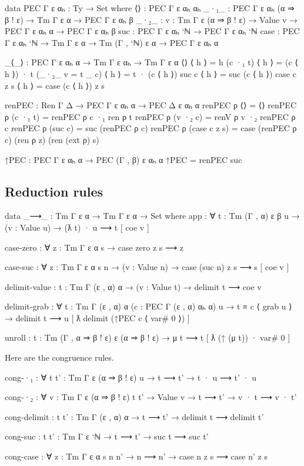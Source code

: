 \begin{code}
data PEC Γ ε αₕ : Ty → Set where
  ⟨⟩ : PEC Γ ε αₕ αₕ
  _·₁_ : PEC Γ ε αₕ (α ⇒ β ! ε) → Tm Γ ε α → PEC Γ ε αₕ β
  _·₂_ : {v : Tm Γ ε (α ⇒ β ! ε)} → Value v → PEC Γ ε αₕ α → PEC Γ ε αₕ β
  suc : PEC Γ ε αₕ `ℕ → PEC Γ ε αₕ `ℕ
  case : PEC Γ ε αₕ `ℕ → Tm Γ ε α → Tm (Γ , `ℕ) ε α → PEC Γ ε αₕ α

_⟨_⟩ : PEC Γ ε αₕ α → Tm Γ ε αₕ → Tm Γ ε α
⟨⟩ ⟨ h ⟩ = h
(c ·₁ t) ⟨ h ⟩ = (c ⟨ h ⟩) · t
(_·₂_ {v = t} _ c) ⟨ h ⟩ = t · (c ⟨ h ⟩)
suc c ⟨ h ⟩ = suc (c ⟨ h ⟩)
case c z s ⟨ h ⟩ = case (c ⟨ h ⟩) z s

renPEC : Ren Γ Δ → PEC Γ ε αₕ α → PEC Δ ε αₕ α
renPEC ρ ⟨⟩ = ⟨⟩
renPEC ρ (c ·₁ t) = renPEC ρ c ·₁ ren ρ t
renPEC ρ (v ·₂ c) = renV ρ v ·₂ renPEC ρ c
renPEC ρ (suc c) = suc (renPEC ρ c)
renPEC ρ (case c z s) = case (renPEC ρ c) (ren ρ z) (ren (ext ρ) s)

↑PEC : PEC Γ ε αₕ α → PEC (Γ , β) ε αₕ α
↑PEC = renPEC suc
\end{code}

\subsection{Reduction rules}

\begin{AgdaAlign}
\begin{code}
data _⟶_ : Tm Γ ε α → Tm Γ ε α → Set where
  app : ∀ {t : Tm (Γ , α) ε β} {u}
    → (v : Value u)
    → (ƛ t) · u ⟶ t [ coe v ]

  case-zero : ∀ {z : Tm Γ ε α} {s}
    → case zero z s ⟶ z

  case-suc : ∀ {z : Tm Γ ε α} {s n}
    → (v : Value n)
    → case (suc n) z s ⟶ s [ coe v ]

  delimit-value : {t : Tm Γ (ε , α) α}
    → (v : Value t)
    → delimit t ⟶ coe v

  delimit-grab : ∀ {t : Tm Γ (ε , α) α} (c : PEC Γ (ε , α) αₕ α) {u}
    → t ≡ c ⟨ grab u ⟩
    → delimit t ⟶ u [ ƛ delimit (↑PEC c ⟨ var# 0 ⟩) ]

  unroll : {t : Tm (Γ , α ⇒ β ! ε) ε (α ⇒ β ! ε)}
    → μ t ⟶ t [ ƛ (↑ (μ t)) · var# 0 ]
\end{code}

Here are the congruence rules.

\begin{code}
  cong-·₁ : ∀ {t t' : Tm Γ ε (α ⇒ β ! ε)} {u}
    → t ⟶ t'
    → t · u ⟶ t' · u

  cong-·₂ : ∀ {v : Tm Γ ε (α ⇒ β ! ε)} {t t'}
    → Value v
    → t ⟶ t'
    → v · t ⟶ v · t'

  cong-delimit : {t t' : Tm Γ (ε , α) α}
    → t ⟶ t'
    → delimit t ⟶ delimit t'

  cong-suc : {t t' : Tm Γ ε `ℕ}
    → t ⟶ t'
    → suc t ⟶ suc t'

  cong-case : ∀ {z : Tm Γ ε α} {s n n'}
    → n ⟶ n'
    → case n z s ⟶ case n' z s
\end{code}
\end{AgdaAlign}

